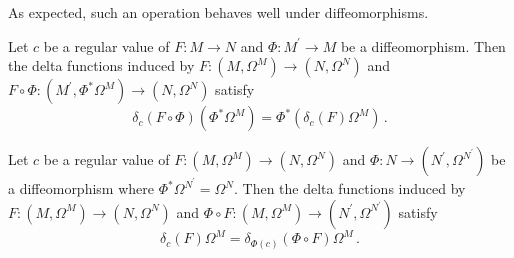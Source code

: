 As expected, such an operation behaves well under diffeomorphisms.
\begin{lemma}\label{diffeoProperty}
Let $c$ be a regular value of $F:M\rightarrow N$ and $\Phi:M^{'}\rightarrow M$ be a diffeomorphism. Then the delta functions induced by $F:(M,\Omega^M)\rightarrow (N,\Omega^N)$ and $F\circ\Phi:(M^{'},\Phi^*\Omega^M)\rightarrow (N,\Omega^N)$ satisfy
\begin{equation}
\delta_c(F\circ\Phi)(\Phi^*\Omega^M)=\Phi^*(\delta_c(F)\Omega^M)\,.
\end{equation}
\end{lemma}

\begin{lemma}
Let $c$ be a regular value of $F:(M,\Omega^M)\rightarrow (N,\Omega^N)$ and $\Phi:N\rightarrow (N^{'},\Omega^{N^{'}})$ be a diffeomorphism where $\Phi^*\Omega^{N^{'}}=\Omega^N$. Then the delta functions induced by $F:(M,\Omega^M)\rightarrow (N,\Omega^N)$ and $\Phi\circ F:(M,\Omega^M)\rightarrow (N^{'},\Omega^{N^{'}})$ satisfy
\begin{equation}
\delta_c(F)\Omega^M=\delta_{\Phi(c)}(\Phi\circ F)\Omega^M\,.
\end{equation}
\end{lemma}

